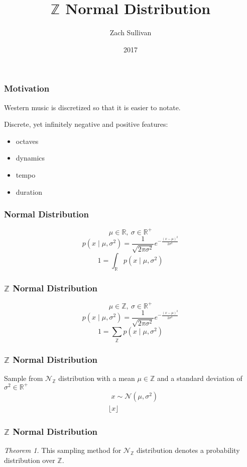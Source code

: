 \documentclass{beamer}
\title{$\mathbb{Z}$ Normal Distribution}
\author{Zach Sullivan}
\date{2017}
\begin{document}
\frame{\titlepage}

\begin{frame}
\frametitle{Motivation}
Western music is discretized so that it is easier to notate.
\vspace{1em}

Discrete, yet infinitely negative and positive features:
\begin{itemize}
\item octaves
\item dynamics
\item tempo
\item duration
\end{itemize}
\end{frame}

\begin{frame}
\frametitle{Normal Distribution}
\[ \mu \in \mathbb{R},\ \sigma \in \mathbb{R}^+
\]
\vspace{1em}
\[ p(x \mid \mu, \sigma^2) =
  \frac{1}{\sqrt{2\pi\sigma^2}} e^{-\frac{(x - \mu)^2}{2\sigma^2}}
\]
\vspace{1em}
\[ 1 = \int_\mathbb{R} p(x \mid \mu, \sigma^2)
\]
\end{frame}

\begin{frame}
\frametitle{$\mathbb{Z}$ Normal Distribution}
\[ \mu \in \mathbb{Z},\ \sigma \in \mathbb{R}^+
\]
\vspace{1em}
\[ p(x \mid \mu, \sigma^2) =
  \frac{1}{\sqrt{2\pi\sigma^2}} e^{-\frac{(x - \mu)^2}{2\sigma^2}}
\]
\vspace{1em}
\[ 1 = \sum_\mathbb{Z} p(x \mid \mu, \sigma^2)
\]
\end{frame}

\begin{frame}
\frametitle{$\mathbb{Z}$ Normal Distribution}
Sample from $\mathcal{N}_{\mathbb{Z}}$ distribution with a mean
$\mu \in \mathbb{Z}$ and a standard deviation of $\sigma^2 \in \mathbb{R}^+$
\begin{align*}
&\ \,x \sim \mathcal{N}(\mu,\sigma^2)\\
&\lfloor x \rfloor
\end{align*}
\end{frame}

\begin{frame}
\frametitle{$\mathbb{Z}$ Normal Distribution}
{\it Theorem 1.} This sampling method for $\mathcal{N}_{\mathbb{Z}}$ distribution
denotes a probability distribution over $\mathbb{Z}$.
\end{frame}
\end{document}
